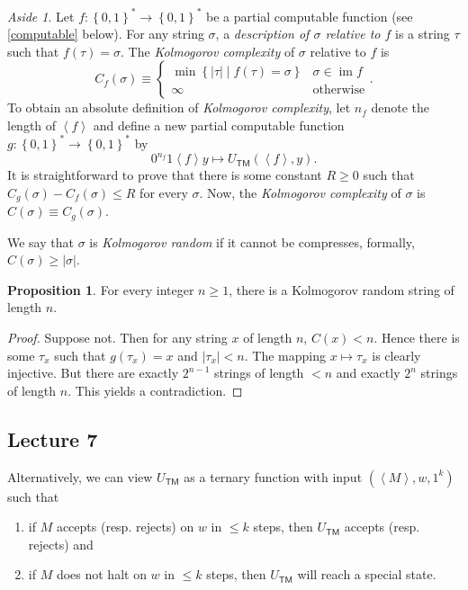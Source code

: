 \documentclass[10pt,letterpaper,cm]{nupset}
\theoremstyle{definition}
\theoremstyle{theorem}
\newtheorem{prop}[definition]{Proposition}
\theoremstyle{remark}
\newtheorem*{aside}{Aside}
\newcommand{\1}{\mathbf{1}}
\newcommand{\0}{\vec 0}
\DeclareMathOperator{\im}{im}
\DeclareMathOperator{\TM}{\mathsf{TM}}
\begin{document}
\begin{aside}
Let  $f:\left\{0,1\right\}^{\ast} \to\left\{0,1\right\}^{\ast}$ be a partial computable function (see \cref{computable} below). For any string $\sigma$, a \textit{description of $\sigma$ relative to $f$} is a string $\tau$ such that $f(\tau) = \sigma$. The \textit{Kolmogorov complexity} of $\sigma$ relative to $f$ is
\[
C_f(\sigma ) \equiv  \begin{cases}
\min\left\{\left\lvert{\tau}\right\rvert \mid f(\tau) = \sigma\right\} & \sigma \in \im{f}
\\ \infty & \text{otherwise}
\end{cases}.
\] To obtain an absolute definition of \textit{Kolmogorov complexity}, let $n_f$ denote the length of $\left\langle f\right\rangle$ and define a new partial computable function $g: \left\{0,1\right\}^{\ast} \to\left\{0,1\right\}^{\ast}$ by
\[
0^{n_f}1\left\langle f\right\rangle y \mapsto U_{\TM}(\left\langle f\right\rangle, y).
\] It is straightforward to prove that there is some constant $R\geq 0$ such that $C_g(\sigma) - C_f(\sigma) \leq R$ for every $\sigma$. Now, the \textit{Kolmogorov complexity} of $\sigma$ is $C(\sigma) \equiv C_g(\sigma)$.

\smallskip

We say that $\sigma$ is \textit{Kolmogorov random} if it cannot be compresses, formally, $C(\sigma) \geq \left\lvert{\sigma}\right\rvert$.

\begin{prop}
For every integer $n\geq 1$, there is a Kolmogorov random string of length $n$.
\end{prop}
\begin{proof}
Suppose not. Then for any string $x$ of length $n$, $C(x) < n$.  Hence there is some $\tau_x$ such that $g(\tau_x) = x$ and $\left\lvert{\tau_x}\right\rvert < n$. The mapping $x \mapsto \tau_x$ is clearly injective. But there are exactly $2^{n-1}$ strings of length $< n$ and exactly $2^n$ strings of length $n$. This yields a contradiction.
\end{proof}
\end{aside}


\subsection{Lecture 7}


Alternatively, we can view $U_{\TM}$ as a ternary function with input $\left(\left\langle M \right\rangle,  w, 1^k\right)$ such that
\begin{enumerate}[label=(\roman*)]
\item if $M$ accepts (resp. rejects) on $w$ in $\leq k$ steps, then $U_{\TM}$ accepts (resp. rejects) and
\item if $M$ does not halt on $w$ in $\leq k$ steps, then $U_{\TM}$ will reach a special state.
\end{enumerate}
\end{document}

